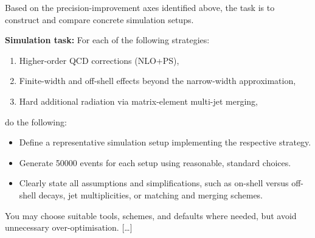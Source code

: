 \documentclass[submission, Phys]{SciPost}
\begin{document}
\begin{userblock}
Based on the precision-improvement axes identified above, the task is to construct and compare concrete simulation setups.

\textbf{Simulation task:}
For each of the following strategies:
\begin{enumerate}
  \item Higher-order QCD corrections (NLO+PS),
  \item Finite-width and off-shell effects beyond the narrow-width approximation,
  \item Hard additional radiation via matrix-element multi-jet merging,
\end{enumerate}
do the following:
\begin{itemize}
  \item Define a representative simulation setup implementing the respective strategy.
  \item Generate 50000 events for each setup using reasonable, standard choices.
  \item Clearly state all assumptions and simplifications, such as on-shell versus off-shell decays, jet multiplicities, or matching and merging schemes.
\end{itemize}

You may choose suitable tools, schemes, and defaults where needed, but avoid unnecessary over-optimisation.
[\ldots]
\end{userblock}
%
\end{document}
